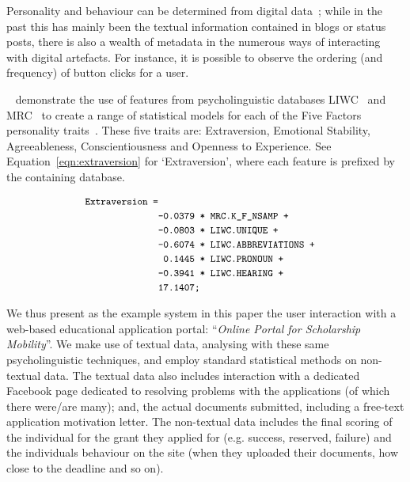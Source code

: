 \documentclass[letterpaper]{article}
\begin{document}
Personality and behaviour can be determined from digital
data~\cite{pennebaker-et-al:2001,vazire+gosling:2004,iacobelli-et-al:2011,oatley+crick:2014};
while in the past this has mainly been the textual information
contained in blogs or status posts, there is also a wealth of metadata
in the numerous ways of interacting with digital artefacts. For
instance, it is possible to observe the ordering (and frequency) of
button clicks for a user.

\citeauthor{mairesse-et-al:2007}~
demonstrate the use of features from psycholinguistic databases
LIWC~\cite{pennebaker-et-al:2001} and MRC~\cite{wilson:1988} to create
a range of statistical models for each of the Five Factors personality
traits~\cite{norman:1963,peabody+goldberg:1989,goldberg:1990}. These
five traits are: Extraversion, Emotional Stability, Agreeableness,
Conscientiousness and Openness to Experience. See
Equation~\ref{eqn:extraversion} for `Extraversion', where each feature
is prefixed by the containing database.

\begin{equation}\label{eqn:extraversion}
\small
\begin{aligned}
\verb!Extraversion =!\\
&\verb!-0.0379 * MRC.K_F_NSAMP +!\\
&\verb!-0.0803 * LIWC.UNIQUE +!\\
&\verb!-0.6074 * LIWC.ABBREVIATIONS +!\\
&\verb! 0.1445 * LIWC.PRONOUN +!\\
&\verb!-0.3941 * LIWC.HEARING +!\\  
&\verb!17.1407;!
\end{aligned}
\end{equation}

We thus present as the example system in this paper the user
interaction with a web-based educational application portal:
``{\emph{Online Portal for Scholarship Mobility}}''. We make use of
textual data, analysing with these same psycholinguistic techniques,
and employ standard statistical methods on non-textual data. The
textual data also includes interaction with a dedicated Facebook page
dedicated to resolving problems with the applications (of which there
were/are many); and, the actual documents submitted, including a
free-text application motivation letter. The non-textual data includes
the final scoring of the individual for the grant they applied for
(e.g. success, reserved, failure) and the individuals behaviour on the
site (when they uploaded their documents, how close to the deadline
and so on).
\end{document}
